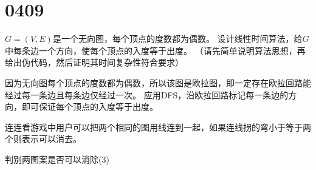 \section{0409}\label{sec:0409}
\begin{questions}

    \question $G=(V,E)$是一个无向图，每个顶点的度数都为偶数。
    设计线性时间算法，给$G$中每条边一个方向，使每个顶点的入度等于出度。
    （请先简单说明算法思想，再给出伪代码，然后证明其时间复杂性符合要求）

    \begin{solution}
        因为无向图每个顶点的度数都为偶数，所以该图是欧拉图，即一定存在欧拉回路能经过每一条边且每条边仅经过一次。
        应用DFS，沿欧拉回路标记每一条边的方向，即可保证每个顶点的入度等于出度。
    \end{solution}

    \question 连连看游戏中用户可以把两个相同的图用线连到一起，如果连线拐的弯小于等于两个则表示可以消去。


    \begin{algorithm}
        \caption{判别两图案是否可以消除(3)}\label{0409:2:3}
        \begin{algorithmic}[1]


\end{algorithmic}
\end{algorithm}
\end{questions}
